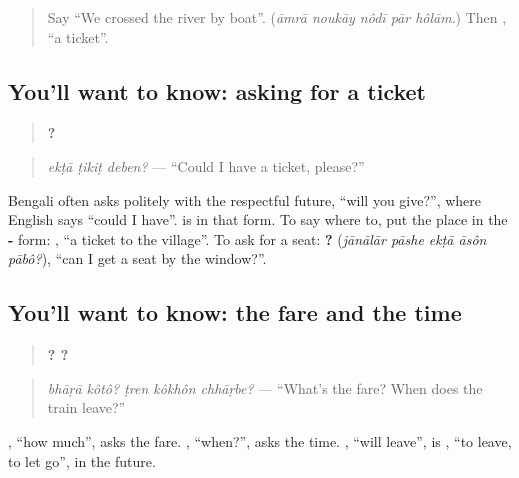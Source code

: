\label{lesson:BN-C271-tikit-deben}



\begin{quote}
Say \textquotedblleft{}We crossed the river by boat\textquotedblright{}. (\emph{āmrā noukāy nôdī pār hôlām}.) Then \textbf{}, \textquotedblleft{}a ticket\textquotedblright{}.
\end{quote}

\subsection*{You'll want to know: asking for a ticket}
\begin{quote}
\textbf{  ?}
\end{quote}

\begin{quote}
\emph{ekṭā ṭikiṭ deben?} — \textquotedblleft{}Could I have a ticket, please?\textquotedblright{}
\end{quote}

Bengali often asks politely with the respectful future, \textquotedblleft{}will you give?\textquotedblright{}, where English says \textquotedblleft{}could I have\textquotedblright{}. \textbf{} is \textbf{} in that form. To say where to, put the place in the \textbf{-} form: \textbf{  }, \textquotedblleft{}a ticket to the village\textquotedblright{}. To ask for a seat: \textbf{    ?} (\emph{jānālār pāshe ekṭā āsôn pābô?}), \textquotedblleft{}can I get a seat by the window?\textquotedblright{}.

\subsection*{You'll want to know: the fare and the time}
\begin{quote}
\textbf{ ?   ?}
\end{quote}

\begin{quote}
\emph{bhāṛā kôtô? ṭren kôkhôn chhāṛbe?} — \textquotedblleft{}What's the fare? When does the train leave?\textquotedblright{}
\end{quote}

\textbf{}, \textquotedblleft{}how much\textquotedblright{}, asks the fare. \textbf{}, \textquotedblleft{}when?\textquotedblright{}, asks the time. \textbf{}, \textquotedblleft{}will leave\textquotedblright{}, is \textbf{}, \textquotedblleft{}to leave, to let go\textquotedblright{}, in the future.

